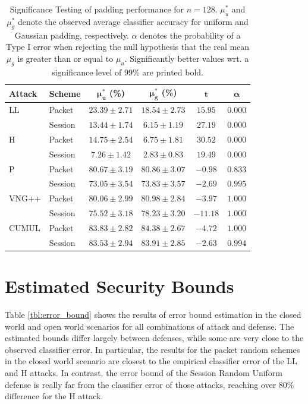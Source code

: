 \documentclass[
	ruledheaders=chapter,
	class=report,
	thesis={type=master, department=inf},
	accentcolor=1c,
	custommargins=true,
	marginpar=false,
	parskip=half-,
	fontsize=11pt,
]{tudapub}
\begin{document}
	\begin{table}
		\centering
		\small
		\begin{tabular}{llcccc}
			\toprule \textbf{Attack} & \textbf{Scheme} & $\mathbf{\mu^*_{u}}$ \textbf{(\%)} & $\mathbf{\mu^*_{g}}$  \textbf{(\%)} & $\mathbf{t}$ & $\mathbf{\alpha}$ \\
			\midrule LL & Packet & $23.39 \pm 2.71$ & $\mathbf{18.54 \pm 2.73}$ & $15.95$ & $0.000$\\
			 & Session & $13.44 \pm 1.74$ & $\mathbf{6.15 \pm 1.19}$ & $27.19$ &  $0.000$\\ \addlinespace
			H & Packet & $14.75 \pm 2.54$ & $\mathbf{6.75 \pm 1.81}$ & $30.52$ & $0.000$ \\
			& Session & $7.26 \pm 1.42$ & $\mathbf{2.83 \pm 0.83}$ & $19.49$ & $0.000$ \\ \addlinespace
			P & Packet & $80.67 \pm 3.19$ & $80.86 \pm 3.07$ & $-0.98$ & $0.833$ \\
			& Session & $\mathbf{73.05 \pm 3.54}$ & $73.83 \pm 3.57$ & $-2.69$ & $0.995$ \\ \addlinespace
			VNG++ & Packet & $\mathbf{80.06 \pm 2.99}$ & $80.98 \pm 2.84$ & $-3.97$ & $1.000$ \\
			& Session & $\mathbf{75.52 \pm 3.18}$ & $78.23 \pm 3.20$ & $-11.18$ & $1.000$ \\ \addlinespace
			CUMUL & Packet & $\mathbf{83.83\pm 2.82}$ & $84.38 \pm 2.67$ & $-4.72$ & $1.000$\\
			& Session & $83.53 \pm 2.94$ & $83.91 \pm 2.85$ & $-2.63$ & $0.994$ \\
			\bottomrule
		\end{tabular}
		\caption[Significance Testing of padding performance for $n = 128$]{Significance Testing of padding performance for $n = 128$. $\mu^*_u$ and $\mu^*_g$ denote the observed average classifier accuracy for uniform and Gaussian padding, respectively. $\alpha$ denotes the probability of a Type I error when rejecting the null hypothesis that the real mean $\mu_g$ is greater than or equal to $\mu_u$. Significantly better values wrt. a significance level of 99\% are printed bold. }
		\label{tbl:sig_score}
	\end{table}

	\section{Estimated Security Bounds}
	\label{security_bounds}
	
	Table \ref{tbl:error_bound} shows the results of error bound estimation in the closed world and open world scenarios for all combinations of attack and defense. The estimated bounds differ largely between defenses, while some are very close to the observed classifier error. In particular, the results for the packet random schemes in the closed world scenario are closest to the empirical classifier error of the LL and H attacks. In contrast, the error bound of the Session Random Uniform defense is really far from the classifier error of those attacks, reaching over 80\% difference for the H attack. 
	
\end{document}
